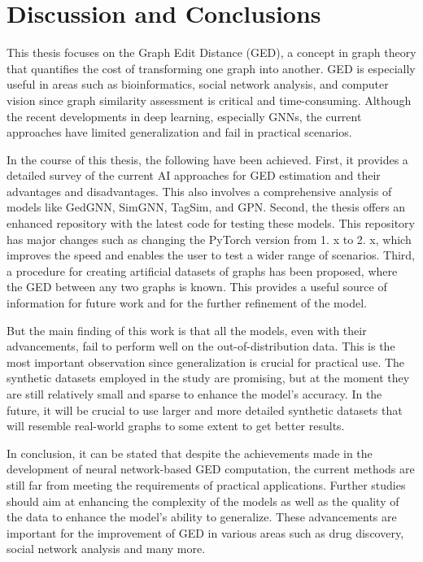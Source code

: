 \documentclass[../Thesis.tex]{subfiles}
\begin{document}
	\section{Discussion and Conclusions}
	\label{sec:discussion_and_conclusions}
	This thesis focuses on the Graph Edit Distance (GED), a concept in graph theory that quantifies the cost of transforming one graph into another. GED is especially useful in areas such as bioinformatics, social network analysis, and computer vision since graph similarity assessment is critical and time-consuming. Although the recent developments in deep learning, especially GNNs, the current approaches have limited generalization and fail in practical scenarios.
	
	In the course of this thesis, the following have been achieved. First, it provides a detailed survey of the current AI approaches for GED estimation and their advantages and disadvantages. This also involves a comprehensive analysis of models like GedGNN, SimGNN, TagSim, and GPN. Second, the thesis offers an enhanced repository with the latest code for testing these models. This repository has major changes such as changing the PyTorch version from 1. x to 2. x, which improves the speed and enables the user to test a wider range of scenarios. Third, a procedure for creating artificial datasets of graphs has been proposed, where the GED between any two graphs is known. This provides a useful source of information for future work and for the further refinement of the model.
	
	But the main finding of this work is that all the models, even with their advancements, fail to perform well on the out-of-distribution data. This is the most important observation since generalization is crucial for practical use. The synthetic datasets employed in the study are promising, but at the moment they are still relatively small and sparse to enhance the model’s accuracy. In the future, it will be crucial to use larger and more detailed synthetic datasets that will resemble real-world graphs to some extent to get better results.
	
	In conclusion, it can be stated that despite the achievements made in the development of neural network-based GED computation, the current methods are still far from meeting the requirements of practical applications. Further studies should aim at enhancing the complexity of the models as well as the quality of the data to enhance the model’s ability to generalize. These advancements are important for the improvement of GED in various areas such as drug discovery, social network analysis and many more.
\end{document}
